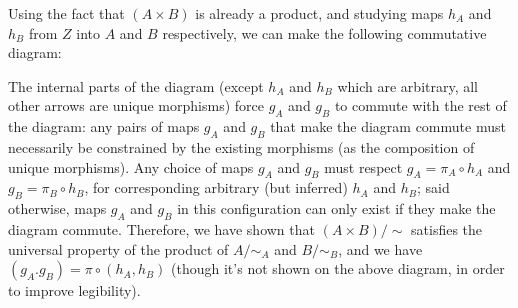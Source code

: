 Using the fact that $(A \times B)$ is already a product, and studying maps $h_A$ and $h_B$ from $Z$ into $A$ and $B$ respectively, we can make the following commutative diagram:


The internal parts of the diagram (except $h_A$ and $h_B$ which are arbitrary, all other arrows are unique morphisms) force $g_A$ and $g_B$ to commute with the rest of the diagram: any pairs of maps $g_A$ and $g_B$ that make the diagram commute must necessarily be constrained by the existing morphisms (as the composition of unique morphisms). Any choice of maps $g_A$ and $g_B$ must respect $g_A = \pi_A \circ h_A$ and $g_B = \pi_B \circ h_B$, for corresponding arbitrary (but inferred) $h_A$ and $h_B$; said otherwise, maps $g_A$ and $g_B$ in this configuration can only exist if they make the diagram commute. Therefore, we have shown that $(A \times B)/\sim$ satisfies the universal property of the product of $A/\sim_A$ and $B/\sim_B$, and we have $(g_A. g_B) = \pi \circ (h_A, h_B)$ (though it's not shown on the above diagram, in order to improve legibility).

